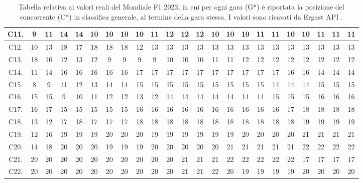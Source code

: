 \documentclass[12pt,a4paper,openright,twoside]{book}
\begin{document}
\begin{table}[H]
{\begin{tabular}{|c|c|c|c|c|c|c|c|c|c|c|c|c|c|c|c|c|c|c|c|c|c|c|}
    C11. & 9 & 11 & 14 & 14 & 10 & 10 & 10 & 10 & 11 & 12 & 12 & 12 & 10 & 10 & 10 & 11 & 11 & 10 & 10 & 11 & 11 & 11 \\ \hline
    C12. & 10 & 13 & 18 & 17 & 18 & 18 & 18 & 12 & 13 & 13 & 13 & 13 & 13 & 13 & 13 & 13 & 13 & 13 & 13 & 13 & 13 & 13 \\ \hline
    C13. & 18 & 10 & 12 & 13 & 12 & 9 & 9 & 9 & 9 & 10 & 10 & 10 & 11 & 11 & 12 & 12 & 12 & 12 & 12 & 12 & 12 & 12 \\ \hline
    C14. & 11 & 14 & 16 & 16 & 16 & 16 & 16 & 17 & 17 & 17 & 17 & 17 & 17 & 17 & 17 & 17 & 17 & 16 & 16 & 14 & 14 & 14 \\ \hline
    C15. & 8 & 9 & 11 & 12 & 13 & 14 & 14 & 15 & 15 & 15 & 15 & 15 & 15 & 15 & 15 & 15 & 14 & 14 & 14 & 15 & 15 & 15 \\ \hline
    C16. & 15 & 15 & 9 & 10 & 11 & 12 & 12 & 13 & 12 & 14 & 14 & 14 & 14 & 14 & 14 & 14 & 15 & 15 & 15 & 16 & 16 & 16 \\ \hline
    C17. & 16 & 17 & 15 & 15 & 15 & 15 & 15 & 16 & 16 & 16 & 16 & 16 & 16 & 16 & 16 & 16 & 16 & 17 & 18 & 18 & 18 & 18 \\ \hline
    C18. & 13 & 12 & 17 & 18 & 17 & 17 & 17 & 18 & 18 & 18 & 18 & 18 & 18 & 18 & 18 & 18 & 18 & 18 & 19 & 19 & 19 & 19 \\ \hline
    C19. & 12 & 16 & 19 & 19 & 19 & 20 & 20 & 20 & 19 & 19 & 19 & 19 & 19 & 19 & 20 & 20 & 20 & 20 & 21 & 21 & 21 & 21 \\ \hline
    C20. & 14 & 18 & 20 & 20 & 20 & 19 & 19 & 19 & 20 & 20 & 20 & 20 & 20 & 21 & 21 & 21 & 21 & 21 & 22 & 22 & 22 & 22 \\ \hline
    C21. & 20 & 20 & 20 & 20 & 20 & 20 & 20 & 20 & 20 & 20 & 21 & 21 & 21 & 22 & 22 & 22 & 22 & 22 & 17 & 17 & 17 & 17 \\ \hline
    C22. & 20 & 20 & 20 & 20 & 20 & 20 & 20 & 20 & 20 & 20 & 21 & 21 & 22 & 20 & 19 & 19 & 19 & 19 & 20 & 20 & 20 & 20 \\ \hline
    \end{tabular}}
    \endgroup

    \caption{Tabella relativa ai valori reali del Mondiale F1 2023, in cui per ogni gara (G*)  è riportata la posizione del concorrente (C*) in classifica generale, al termine della gara stessa.
    I valori sono ricavati da Ergast API .}
    \label{table:classifichegeneralireali2023tabella}
\end{table}
\end{document}
